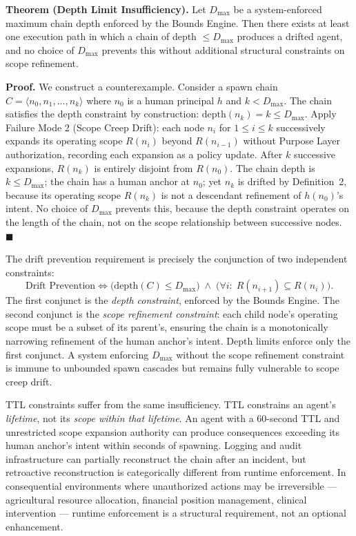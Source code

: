 \documentclass[12pt]{article}
\begin{document}
\medskip
\noindent\textbf{Theorem (Depth Limit Insufficiency).}
Let $D_{\max}$ be a system-enforced maximum chain depth enforced by the Bounds Engine. Then there exists at least one execution path in which a chain of depth $\leq D_{\max}$ produces a drifted agent, and no choice of $D_{\max}$ prevents this without additional structural constraints on scope refinement.

\medskip
\noindent\textbf{Proof.} We construct a counterexample. Consider a spawn chain $C = \langle n_0, n_1, \ldots, n_k \rangle$ where $n_0$ is a human principal $h$ and $k < D_{\max}$. The chain satisfies the depth constraint by construction: $\text{depth}(n_k) = k \leq D_{\max}$. Apply Failure Mode 2 (Scope Creep Drift): each node $n_i$ for $1 \leq i \leq k$ successively expands its operating scope $R(n_i)$ beyond $R(n_{i-1})$ without Purpose Layer authorization, recording each expansion as a policy update. After $k$ successive expansions, $R(n_k)$ is entirely disjoint from $R(n_0)$. The chain depth is $k \leq D_{\max}$; the chain has a human anchor at $n_0$; yet $n_k$ is drifted by Definition~2, because its operating scope $R(n_k)$ is not a descendant refinement of $h(n_0)$'s intent. No choice of $D_{\max}$ prevents this, because the depth constraint operates on the length of the chain, not on the scope relationship between successive nodes. $\blacksquare$

The drift prevention requirement is precisely the conjunction of two independent constraints:
\begin{equation}
\text{Drift Prevention} \iff \bigl( \text{depth}(C) \leq D_{\max} \bigr)\;\land\;\bigl( \forall i:\; R(n_{i+1}) \subseteq R(n_i) \bigr).
\label{eq:drift-prevention-constraint}
\end{equation}
The first conjunct is the \emph{depth constraint}, enforced by the Bounds Engine. The second conjunct is the \emph{scope refinement constraint}: each child node's operating scope must be a subset of its parent's, ensuring the chain is a monotonically narrowing refinement of the human anchor's intent. Depth limits enforce only the first conjunct. A system enforcing $D_{\max}$ without the scope refinement constraint is immune to unbounded spawn cascades but remains fully vulnerable to scope creep drift.

TTL constraints suffer from the same insufficiency. TTL constrains an agent's \emph{lifetime}, not its \emph{scope within that lifetime}. An agent with a 60-second TTL and unrestricted scope expansion authority can produce consequences exceeding its human anchor's intent within seconds of spawning. Logging and audit infrastructure can partially reconstruct the chain after an incident, but retroactive reconstruction is categorically different from runtime enforcement. In consequential environments where unauthorized actions may be irreversible — agricultural resource allocation, financial position management, clinical intervention — runtime enforcement is a structural requirement, not an optional enhancement.
\end{document}
